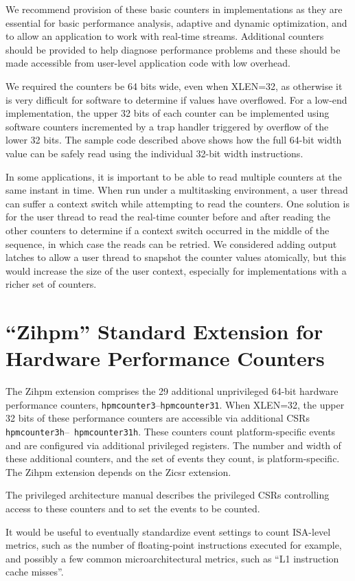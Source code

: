 \begin{commentary}
We recommend provision of these basic counters in implementations
as they are essential for basic performance analysis, adaptive and
dynamic optimization, and to allow an application to work with
real-time streams.  Additional counters should be provided to help
diagnose performance problems and these should be made accessible from
user-level application code with low overhead.

We required the counters be 64 bits wide, even when XLEN=32, as otherwise
it is very difficult for software to determine if values have
overflowed.  For a low-end implementation, the upper 32 bits of each
counter can be implemented using software counters incremented by a
trap handler triggered by overflow of the lower 32 bits.  The sample
code described above shows how the full 64-bit width value can be
safely read using the individual 32-bit width instructions.

In some applications, it is important to be able to read multiple
counters at the same instant in time.  When run under a multitasking
environment, a user thread can suffer a context switch while
attempting to read the counters.  One solution is for the user thread
to read the real-time counter before and after reading the other
counters to determine if a context switch occurred in the middle of the
sequence, in which case the reads can be retried.  We considered
adding output latches to allow a user thread to snapshot the counter
values atomically, but this would increase the size of the user
context, especially for implementations with a richer set of counters.
\end{commentary}

\section{``Zihpm'' Standard Extension for Hardware Performance Counters}

The Zihpm extension comprises the 29 additional unprivileged 64-bit
hardware performance counters, {\tt hpmcounter3}--{\tt hpmcounter31}.
When XLEN=32, the upper 32 bits of these performance counters are
accessible via additional CSRs {\tt hpmcounter3h}--{\tt
  hpmcounter31h}.  These counters count platform-specific events and
are configured via additional privileged registers.  The number and
width of these additional counters, and the set of events they count,
is platform-specific.
The Zihpm extension depends on the Zicsr extension.

\begin{commentary}
  The privileged architecture manual describes the privileged CSRs
  controlling access to these counters and to set the events to be
  counted.

  It would be useful to eventually standardize event settings to count
  ISA-level metrics, such as the number of floating-point instructions
  executed for example, and possibly a few common microarchitectural
  metrics, such as ``L1 instruction cache misses''.
\end{commentary}

